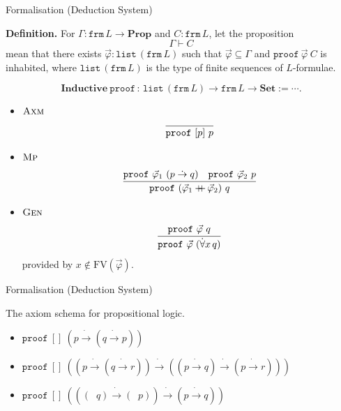 \documentclass[serif,table,10pt]{beamer}
\newcommand{\0}{\texttt{0}}
\newcommand{\1}{\texttt{1}}
\newcommand{\concat}{\ensuremath{+\!\!\!\!+\,}}
\newcommand{\Set}{\mathbf{Set}}
\newcommand{\Prop}{\mathbf{Prop}}
\newcommand{\FV}{\mathrm{FV}}
\newcommand{\proves}[2]{\mathtt{proof}\ #1\ #2 }
\newcommand{\listunit}[1]{[#1]}
\newcommand{\Lneg}{\mathop{\dot{\neg}}}
\newcommand{\Lto}{\mathrel{\dot{\to}}}
\newcommand{\Lall}[1]{\dot{\forall}#1\,}
\begin{document}
\begin{frame}{Formalisation (Deduction System)}

    \textbf{Definition.}
    For $ \Gamma : \mathtt{frm} \, L \to \Prop $ and $ C : \mathtt{frm} \, L $, let the proposition \[\Gamma \vdash C\] mean that there exists $ \vec\varphi : \mathtt{list} \, ( \mathtt{frm} \, L ) $ such that $ \vec\varphi \subseteq \Gamma $ and $ \proves{\vec\varphi}{C} $ is inhabited, where $\mathtt{list} \, ( \mathtt{frm} \, L ) $ is the type of finite sequences of $L$-formulae.

    \[\mathbf{Inductive} \  \mathtt{proof} \, : \, \mathtt{list} \, ( \mathtt{frm} \, L ) \to \mathtt{frm} \, L \to \Set := \cdots . \]

    \begin{itemize}
        \item $\textsc{Axm}$ \[\infer{\proves{\listunit{p}}{p}}{}\]
        \item $\textsc{Mp}$ \[\infer{\proves{(\vec\varphi_1 \concat \vec\varphi_2)}{q}}{\proves{\vec\varphi_1}{(p \Lto q)} & \proves{\vec\varphi_2}{p}}\]
        \item $\textsc{Gen}$ \[\infer{\proves{\vec\varphi}{(\Lall{x} q)}}{\proves{\vec\varphi}{q}}\] provided by $ x \notin \FV ( \vec\varphi ) $.
    \end{itemize}

\end{frame}

\begin{frame}{Formalisation (Deduction System)}

    The axiom schema for propositional logic.

    \begin{itemize}
        \item $\proves{ \listunit{} }{ (p \Lto (q \Lto p)) }$
        \item $\proves{ \listunit{} }{ ((p \Lto (q \Lto r)) \Lto ((p \Lto q) \Lto (p \Lto r))) }$
        \item $\proves{ \listunit{} }{ (((\Lneg q) \Lto (\Lneg p)) \Lto (p \Lto q)) }$
    \end{itemize}

\end{frame}
\end{document}
